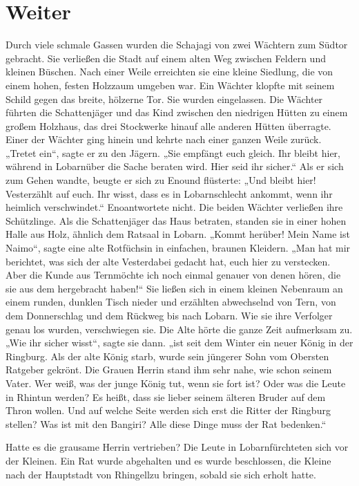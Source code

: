 \documentclass[12pt,a4paper,onecolumn,twoside,ngerman]{book}
\newcommand{\Tern}{Tern}
\newcommand{\Eno}{Eno}
\newcommand{\Lobarn}{Lobarn}
\newcommand{\Vester}{Vester}
\newcommand{\Naimo}{Naimo}
\newcommand{\Rhingell}{Rhingell}
\newcommand{\Rhin}{Rhin}
\begin{document}
\section{Weiter}
Durch viele schmale Gassen wurden die Schajagi von zwei Wächtern zum Südtor gebracht. Sie verließen die Stadt auf einem alten Weg zwischen Feldern und kleinen Büschen. Nach einer Weile erreichten sie eine kleine Siedlung, die von einem hohen, festen Holzzaum umgeben war. Ein Wächter klopfte mit seinem Schild gegen das breite, hölzerne Tor. Sie wurden eingelassen. Die Wächter führten die Schattenjäger und das Kind zwischen den niedrigen Hütten zu einem großem Holzhaus, das drei Stockwerke hinauf alle anderen Hütten überragte. Einer der Wächter ging hinein und kehrte nach einer ganzen Weile zurück.
„Tretet ein“, sagte er zu den Jägern. „Sie empfängt euch gleich. Ihr bleibt hier, während in \Lobarn über die Sache beraten wird. Hier seid ihr sicher.“ Als er sich zum Gehen wandte, beugte er sich zu \Eno und flüsterte: „Und bleibt hier! \Vester zählt auf euch. Ihr wisst, dass es in \Lobarn schlecht ankommt, wenn ihr heimlich verschwindet.“
\Eno antwortete nicht. Die beiden Wächter verließen ihre Schützlinge.
Als die Schattenjäger das Haus betraten, standen sie in einer hohen Halle aus Holz, ähnlich dem Ratsaal in \Lobarn.
„Kommt herüber! Mein Name ist \Naimo “, sagte eine alte Rotfüchsin in einfachen, braunen Kleidern. „Man hat mir berichtet, was sich der alte \Vester dabei gedacht hat, euch hier zu verstecken. Aber die Kunde aus \Tern möchte ich noch einmal genauer von denen hören, die sie aus dem \Enland hergebracht haben!“
Sie ließen sich in einem kleinen Nebenraum an einem runden, dunklen Tisch nieder und erzählten abwechselnd von \Tern, von dem Donnerschlag und dem Rückweg bis nach \Lobarn. Wie sie ihre Verfolger genau los wurden, verschwiegen sie.
Die Alte hörte die ganze Zeit aufmerksam zu.
„Wie ihr sicher wisst“, sagte sie dann. „ist seit dem Winter ein neuer König in der Ringburg. Als der alte König starb, wurde sein jüngerer Sohn vom Obersten Ratgeber gekrönt. Die Grauen Herrin stand ihm sehr nahe, wie schon seinem Vater. Wer weiß, was der junge König tut, wenn sie fort ist? Oder was die Leute in \Rhin tun werden? Es heißt, dass sie lieber seinem älteren Bruder auf dem Thron wollen. Und auf welche Seite werden sich erst die Ritter der Ringburg stellen? Was ist mit den Bangiri? Alle diese Dinge muss der Rat bedenken.“  

Hatte es die grausame Herrin vertrieben?
Die Leute in \Lobarn fürchteten sich vor der Kleinen. Ein Rat wurde abgehalten und es wurde beschlossen, die Kleine nach der Hauptstadt von \Rhingell zu bringen, sobald sie sich erholt hatte.
\end{document}
